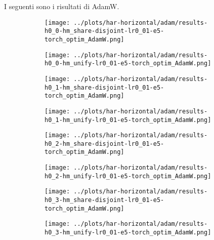 \clearpage
I seguenti sono i risultati di AdamW.
\begin{figure}[htbp]  %
    \centering
    \begin{subfigure}[b]{0.47\textwidth}
        \centering
        \texttt{[image: ../plots/har-horizontal/adam/results-h0\_0-hm\_share-disjoint-lr0\_01-e5-torch\_optim\_AdamW.png]}
    \end{subfigure}
    \hfill
    \begin{subfigure}[b]{0.47\textwidth}
        \centering
        \texttt{[image: ../plots/har-horizontal/adam/results-h0\_0-hm\_unify-lr0\_01-e5-torch\_optim\_AdamW.png]}
    \end{subfigure}
\end{figure}
\begin{figure}[htbp]  %
    \centering
    \begin{subfigure}[b]{0.47\textwidth}
        \centering
        \texttt{[image: ../plots/har-horizontal/adam/results-h0\_1-hm\_share-disjoint-lr0\_01-e5-torch\_optim\_AdamW.png]}
    \end{subfigure}
    \hfill
    \begin{subfigure}[b]{0.47\textwidth}
        \centering
        \texttt{[image: ../plots/har-horizontal/adam/results-h0\_1-hm\_unify-lr0\_01-e5-torch\_optim\_AdamW.png]}
    \end{subfigure}
\end{figure}
\begin{figure}[htbp]  %
    \centering
    \begin{subfigure}[b]{0.47\textwidth}
        \centering
        \texttt{[image: ../plots/har-horizontal/adam/results-h0\_2-hm\_share-disjoint-lr0\_01-e5-torch\_optim\_AdamW.png]}
    \end{subfigure}
    \hfill
    \begin{subfigure}[b]{0.47\textwidth}
        \centering
        \texttt{[image: ../plots/har-horizontal/adam/results-h0\_2-hm\_unify-lr0\_01-e5-torch\_optim\_AdamW.png]}
    \end{subfigure}
\end{figure}
\begin{figure}[htbp]  %
    \centering
    \begin{subfigure}[b]{0.47\textwidth}
        \centering
        \texttt{[image: ../plots/har-horizontal/adam/results-h0\_3-hm\_share-disjoint-lr0\_01-e5-torch\_optim\_AdamW.png]}
    \end{subfigure}
    \hfill
    \begin{subfigure}[b]{0.47\textwidth}
        \centering
        \texttt{[image: ../plots/har-horizontal/adam/results-h0\_3-hm\_unify-lr0\_01-e5-torch\_optim\_AdamW.png]}
    \end{subfigure}
\end{figure}
